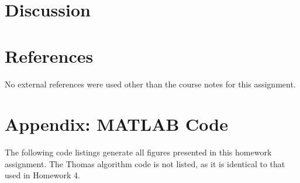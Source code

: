 \documentclass[11pt]{article}
\begin{document}
\section{Discussion} %

\section{References} %

No external references were used other than the course notes for this assignment.

\section*{Appendix: MATLAB Code} %

The following code listings generate all figures presented in this homework assignment. The Thomas algorithm code is not listed, as it is identical to that used in Homework 4.


\end{document}

